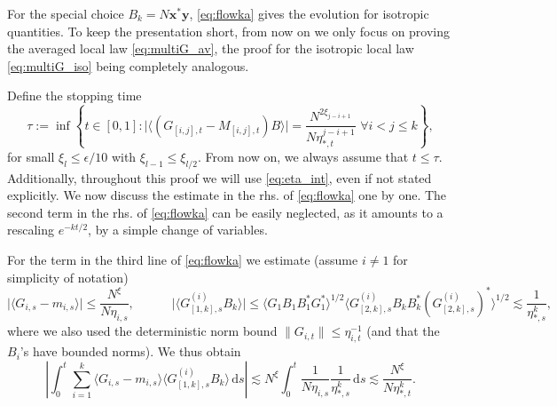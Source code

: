 \documentclass[10pt]{amsart}
\numberwithin{equation}{section}
\newcommand{\dif}{\mathrm{d}}
\begin{document}
For the special choice $B_k=N{\bm x}^* {\bm y}$, \eqref{eq:flowka} gives the evolution for isotropic quantities. To keep the presentation short, from now on we only focus on proving the averaged local law \eqref{eq:multiG_av}, the proof for the isotropic local law \eqref{eq:multiG_iso} being completely analogous.

Define the stopping time
\begin{equation}
\tau:=\inf\left\{t\in [0,1]: \big|\langle (G_{[i,j],t}-M_{{[i,j]},t})B\rangle\big|=\frac{N^{2\xi_{j-i+1}}}{N\eta_{*,t}^{j-i+1}}\,\, \forall i<j\le k\right\},
\end{equation}
for small $\xi_l\le \epsilon/10$ with $\xi_{l-1}\le \xi_{l/2}$. From now on, we always assume that $t\le \tau$. Additionally, throughout this proof we will use \eqref{eq:eta_int}, even if not stated explicitly. We now discuss the estimate in the rhs. of \eqref{eq:flowka} one by one. The second term in the rhs. of \eqref{eq:flowka} can be easily neglected, as it amounts to a rescaling $e^{-kt/2}$, by a simple change of variables.

For the term in the third line of \eqref{eq:flowka} we estimate (assume $i\ne 1$ for simplicity of notation)
\[
\big|\langle G_{i,s}-m_{i,s}\rangle\big|\le \frac{N^\xi}{N\eta_{i,s}}, \qquad\quad \big|\langle G^{(i)}_{[1,k],s}B_k\rangle\big|\le \langle G_1B_1B_1^*G_1^*\rangle^{1/2} \langle G^{(i)}_{[2,k],s}B_kB_k^*(G^{(i)}_{[2,k],s})^*\rangle^{1/2}\lesssim \frac{1}{\eta_{*,s}^k},
\]
where we also used the deterministic norm bound $\lVert G_{i,t}\rVert\le \eta_{i,t}^{-1}$ (and that the $B_i$'s have bounded norms). We thus obtain
\begin{equation}
\left|\int_0^t\sum_{i=1}^k \langle G_{i,s}-m_{i,s}\rangle \langle G^{(i)}_{[1,k],s}B_k\rangle\, \dif s\right|\lesssim N^\xi \int_0^t \frac{1}{N\eta_{i,s}}\frac{1}{\eta_{*,s}^k}\, \dif s\lesssim \frac{N^\xi}{N\eta_{*,t}^k}.
\end{equation}
\end{document}
